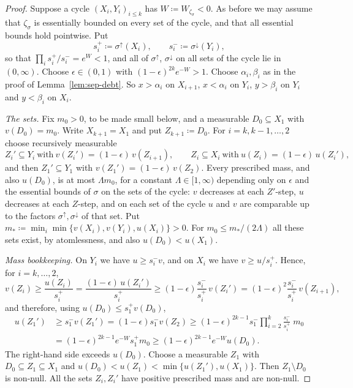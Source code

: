\documentclass[11pt]{article}
\theoremstyle{definition}\newtheorem{definition}[theorem]{Definition}
\theoremstyle{remark}\newtheorem{remark}[theorem]{Remark}
\begin{document}
\begin{proof}
Suppose a cycle $(X_i,Y_i)_{i\le k}$ has $W\coloneqq W_{\zeta_\sigma}<0$. As
before we may assume that $\zeta_\sigma$ is essentially bounded on every set
of the cycle, and that all essential bounds hold pointwise. Put
\[
 s_i^+\coloneqq\sigma^{\uparrow}(X_i),\qquad s_i^-\coloneqq\sigma^{\downarrow}(Y_i),
\]
so that $\prod_is_i^+/s_i^-=e^{W}<1$, and all of $\sigma^{\uparrow}$,
$\sigma^{\downarrow}$ on all sets of the cycle lie in $(0,\infty)$. Choose
$\epsilon\in(0,1)$ with $(1-\epsilon)^{2k}e^{-W}>1$. Choose $\alpha_i,\beta_i$
as in the proof of Lemma~\ref{lem:sep-debt}. So $x>\alpha_i$ on $X_{i+1}$,
$x<\alpha_i$ on $Y_i$, $y>\beta_i$ on $Y_i$ and $y<\beta_i$ on $X_i$.

\emph{The sets.} Fix $m_0>0$, to be made small below, and a measurable
$D_0\subseteq X_1$ with $v(D_0)=m_0$. Write $X_{k+1}=X_1$ and put
$Z_{k+1}\coloneqq D_0$. For $i=k,k-1,\dots,2$ choose recursively measurable
\[
 Z_i'\subseteq Y_i\ \text{with}\ v(Z_i')=(1-\epsilon)\,v(Z_{i+1}),\qquad
 Z_i\subseteq X_i\ \text{with}\ u(Z_i)=(1-\epsilon)\,u(Z_i'),
\]
and then $Z_1'\subseteq Y_1$ with $v(Z_1')=(1-\epsilon)\,v(Z_2)$. Every
prescribed mass, and also $u(D_0)$, is at most $\Lambda m_0$, for a constant
$\Lambda\in[1,\infty)$ depending only on $\epsilon$ and the essential bounds
of $\sigma$ on the sets of the cycle: $v$ decreases at each $Z'$-step, $u$
decreases at each $Z$-step, and on each set of the cycle $u$ and $v$ are
comparable up to the factors $\sigma^{\uparrow},\sigma^{\downarrow}$ of that
set. Put $m_*\coloneqq\min_i\min\{v(X_i),v(Y_i),u(X_i)\}>0$. For
$m_0\le m_*/(2\Lambda)$ all these sets exist, by atomlessness, and also
$u(D_0)<u(X_1)$.

\emph{Mass bookkeeping.} On $Y_i$ we have $u\ge s_i^-v$, and on $X_i$ we
have $v\ge u/s_i^+$. Hence, for $i=k,\dots,2$,
\[
 v(Z_i)\ge\frac{u(Z_i)}{s_i^+}=\frac{(1-\epsilon)\,u(Z_i')}{s_i^+}
 \ge(1-\epsilon)\frac{s_i^-}{s_i^+}\,v(Z_i')
 =(1-\epsilon)^2\frac{s_i^-}{s_i^+}\,v(Z_{i+1}),
\]
and therefore, using $u(D_0)\le s_1^+v(D_0)$,
\begin{align*}
 u(Z_1')&\ge s_1^-v(Z_1')=(1-\epsilon)s_1^-v(Z_2)
 \ge(1-\epsilon)^{2k-1}s_1^-\prod_{i=2}^k\frac{s_i^-}{s_i^+}\;m_0\\
 &=(1-\epsilon)^{2k-1}e^{-W}s_1^+m_0
 \ge(1-\epsilon)^{2k-1}e^{-W}u(D_0).
\end{align*}
The right-hand side exceeds $u(D_0)$. Choose a measurable $Z_1$ with
$D_0\subseteq Z_1\subseteq X_1$ and
$u(D_0)<u(Z_1)<\min\{u(Z_1'),u(X_1)\}$. Then $Z_1\setminus D_0$ is non-null.
All the sets $Z_i,Z_i'$ have positive prescribed mass and are non-null.


\end{proof}
\end{document}
